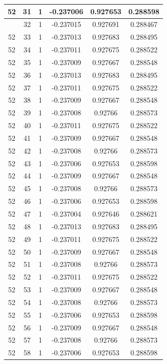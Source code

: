 \documentclass[12pt,a4paper]{article}
\numberwithin{equation}{section}
\numberwithin{figure}{section}
\numberwithin{table}{section}
\begin{document}
\begin{longtable}{|c|c|c|c|c|c|}
52 & 31 & 1 & -0.237006 & 0.927653 & 0.288598 \\ \hline
\pagebreak
52 & 32 & 1 & -0.237015 & 0.927691 & 0.288467 \\ \hline
52 & 33 & 1 & -0.237013 & 0.927683 & 0.288495 \\ \hline
52 & 34 & 1 & -0.237011 & 0.927675 & 0.288522 \\ \hline
52 & 35 & 1 & -0.237009 & 0.927667 & 0.288548 \\ \hline
52 & 36 & 1 & -0.237013 & 0.927683 & 0.288495 \\ \hline
52 & 37 & 1 & -0.237011 & 0.927675 & 0.288522 \\ \hline
52 & 38 & 1 & -0.237009 & 0.927667 & 0.288548 \\ \hline
52 & 39 & 1 & -0.237008 & 0.92766 & 0.288573 \\ \hline
52 & 40 & 1 & -0.237011 & 0.927675 & 0.288522 \\ \hline
52 & 41 & 1 & -0.237009 & 0.927667 & 0.288548 \\ \hline
52 & 42 & 1 & -0.237008 & 0.92766 & 0.288573 \\ \hline
52 & 43 & 1 & -0.237006 & 0.927653 & 0.288598 \\ \hline
52 & 44 & 1 & -0.237009 & 0.927667 & 0.288548 \\ \hline
52 & 45 & 1 & -0.237008 & 0.92766 & 0.288573 \\ \hline
52 & 46 & 1 & -0.237006 & 0.927653 & 0.288598 \\ \hline
52 & 47 & 1 & -0.237004 & 0.927646 & 0.288621 \\ \hline
52 & 48 & 1 & -0.237013 & 0.927683 & 0.288495 \\ \hline
52 & 49 & 1 & -0.237011 & 0.927675 & 0.288522 \\ \hline
52 & 50 & 1 & -0.237009 & 0.927667 & 0.288548 \\ \hline
52 & 51 & 1 & -0.237008 & 0.92766 & 0.288573 \\ \hline
52 & 52 & 1 & -0.237011 & 0.927675 & 0.288522 \\ \hline
52 & 53 & 1 & -0.237009 & 0.927667 & 0.288548 \\ \hline
52 & 54 & 1 & -0.237008 & 0.92766 & 0.288573 \\ \hline
52 & 55 & 1 & -0.237006 & 0.927653 & 0.288598 \\ \hline
52 & 56 & 1 & -0.237009 & 0.927667 & 0.288548 \\ \hline
52 & 57 & 1 & -0.237008 & 0.92766 & 0.288573 \\ \hline
52 & 58 & 1 & -0.237006 & 0.927653 & 0.288598 \\ \hline

\end{longtable}
\end{document}
